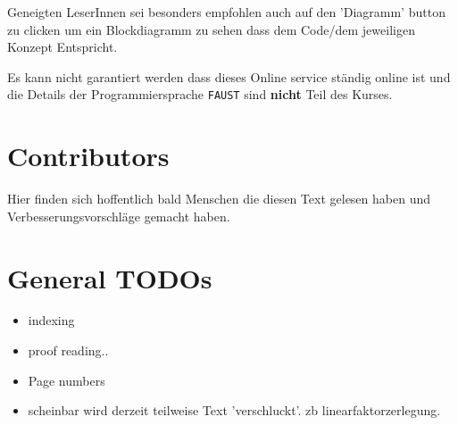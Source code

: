 Geneigten LeserInnen sei besonders empfohlen auch auf den 'Diagramm' button zu clicken um ein Blockdiagramm zu sehen dass dem Code/dem jeweiligen Konzept Entspricht.

Es kann nicht garantiert werden dass dieses Online service ständig online ist und die Details der Programmiersprache \texttt{FAUST} sind \textbf{nicht} Teil des Kurses.


\section*{Contributors}
Hier finden sich hoffentlich bald Menschen die diesen Text gelesen haben und Verbesserungsvorschläge gemacht haben.

\section*{General TODOs}
\begin{itemize}
	\item indexing
	\item proof reading..
	\item Page numbers
	\item scheinbar wird derzeit teilweise Text 'verschluckt'. zb linearfaktorzerlegung.
\end{itemize}

